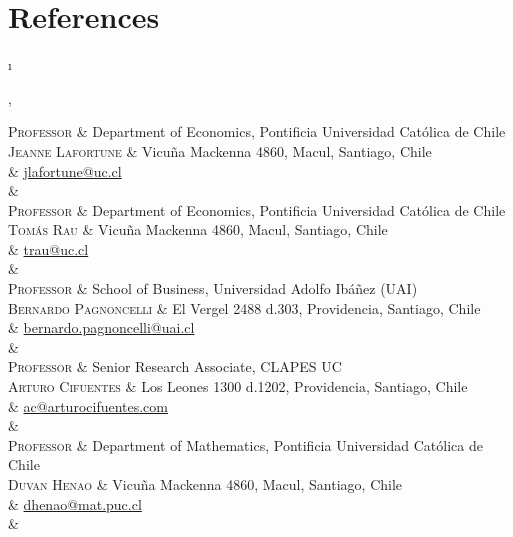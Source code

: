 \documentclass[a4paper, margins=2cm,10pt]{article}
\newcommand{\tablength}{}
\newcommand{\setTabParams}[1]{\renewcommand\tablength{}\forcsvlist{\listadd\tablength}{#1}}
\newcommand{\setCols}[1]{			%
	\ifnum0=\i						%
		\ifdim0cm=#1				%
			\def \firstCol {r}		%
		\else						%
			\def \firstCol {p{#1}}		%
		\fi						%
	\else \ifnum1=\i				%
		\ifdim0cm=#1				%
			\def \secondCol {l}		%
		\else						%
			\def \secondCol{p{#1}}	%
		\fi						%
	\else \ifnum2=\i				%
		\ifnum0=#1				%
			\def \sep {}			%
		\else						%
			\def \sep {|}			%
		\fi						%
	\fi \fi \fi						%
	\advance\i by1					%
}
\newcommand{\tab}[1]{					%
	\newcount\i						%
	\forlistloop{\setCols}{\tablength}		%
	\begin{tabular}{\firstCol \sep \secondCol}	%
		#1							%
	\end{tabular} \\						%
}
\begin{document}
\section{References}
\setTabParams{0cm,0cm,0}

\tab{
\textsc{Professor}
	&	Department of Economics, Pontificia Universidad Católica de Chile		\\[0.2ex]
\textsc{Jeanne Lafortune}
	& 	Vicuña Mackenna 4860, Macul, Santiago, Chile					\\[0.2ex]
	&	\href{mailto:jlafortune@uc.cl}{jlafortune@uc.cl}					\\[0.2ex]
	&	\\

\textsc{Professor}
	&	Department of Economics, Pontificia Universidad Católica de Chile		\\[0.2ex]
\textsc{Tomás Rau}
	& 	Vicuña Mackenna 4860, Macul, Santiago, Chile					\\[0.2ex]
	&	\href{mailto:trau@uc.cl}{trau@uc.cl}							\\[0.2ex]
	&	\\

\textsc{Professor}
	&	School of Business, Universidad Adolfo Ibáñez (UAI)				\\[0.2ex]
\textsc{Bernardo Pagnoncelli}
	& 	El Vergel 2488 d.303, Providencia, Santiago, Chile				\\[0.2ex]
	&	\href{mailto:bernardo.pagnoncelli@uai.cl}{bernardo.pagnoncelli@uai.cl}	\\[0.2ex]
	&	\\

\textsc{Professor}
	&	Senior Research Associate, CLAPES UC	 					\\[0.2ex]
\textsc{Arturo Cifuentes}
	& 	Los Leones 1300 d.1202, Providencia, Santiago, Chile				\\[0.2ex]
	&	\href{mailto:ac@arturocifuentes.com}{ac@arturocifuentes.com}		\\[0.2ex]
	&	\\

\textsc{Professor}
	&	Department of Mathematics, Pontificia Universidad Católica de Chile	\\[0.2ex]
\textsc{Duvan Henao}
	& 	Vicuña Mackenna 4860, Macul, Santiago, Chile					\\[0.2ex]
	&	\href{mailto:dhenao@mat.puc.cl}{dhenao@mat.puc.cl}			\\[0.2ex]
	&	\\
}
\end{document}
